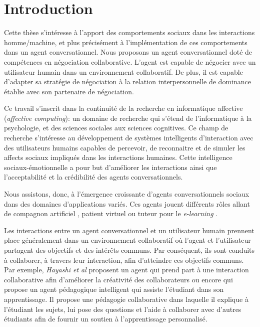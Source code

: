 \chapter{Introduction}


Cette thèse s'intéresse à l'apport des comportements sociaux dans les interactions homme/machine, et plus précisément à l'implémentation de ces comportements dans un agent conversationnel. Nous proposons un agent conversationnel doté de compétences en négociation collaborative. L'agent est capable de négocier avec un utilisateur humain dans un environnement collaboratif. De plus, il est capable d'adapter sa stratégie de négociation à la relation interpersonnelle de dominance établie avec son partenaire de négociation. 

Ce travail s'inscrit dans la continuité de la recherche en informatique affective (\emph{affective computing}): un domaine de recherche qui s'étend de l'informatique à la psychologie, et des sciences sociales aux sciences cognitives. Ce champ de recherche s'intéresse au développement de systèmes intelligents d'interaction avec des utilisateurs humains capables de percevoir, de reconnaitre et de simuler les affects sociaux impliqués dans les interactions humaines. Cette intelligence sociaux-émotionnelle a pour but d'améliorer les interactions ainsi que l'acceptabilité et la crédibilité des agents conversationnels. 

Nous assistons, donc, à l'émergence croissante d'agents conversationnels sociaux dans des domaines d'applications variés.  Ces agents jouent différents rôles allant de compagnon artificiel \cite{ring2013addressing,sidner2013always}, patient virtuel \cite{kenny2007virtual,kleinheksel2017virtual} ou tuteur pour le \emph{e-learning}  \cite{kerly2008calmsystem,kerry2009conversational}.

Les interactions entre un agent conversationnel et un utilisateur humain prennent place généralement dans un environnement collaboratif où l'agent et l'utilisateur partagent des objectifs et des intérêts communs. 
Par conséquent, ils sont conduits à collaborer, à travers leur interaction, afin d'atteindre ces objectifs communs. 
Par exemple, \emph{Hayashi et al} proposent un agent qui prend part à une interaction collaborative afin d'améliorer la créativité des collaborateurs \cite{hayashi2013embodied} ou encore \cite{soliman2010intelligent} qui propose un agent pédagogique intelligent qui assiste  l'étudiant dans son apprentissage. Il propose une pédagogie collaborative dans laquelle il explique à l'étudiant les sujets, lui pose des questions et l'aide à collaborer avec d'autres étudiants afin de fournir un soutien à l'apprentissage personnalisé.

